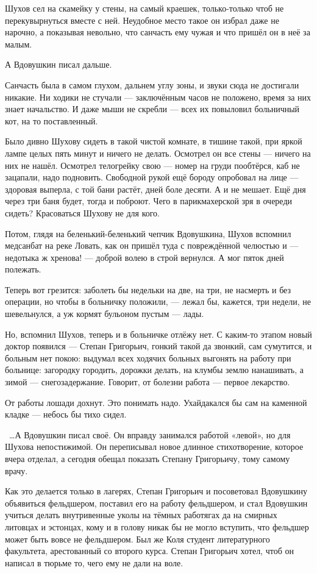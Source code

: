 Шухов сел на скамейку у стены, на самый краешек, только-только чтоб не перекувырнуться вместе с ней. Неудобное место такое он избрал даже не нарочно, а показывая невольно, что санчасть ему чужая и что пришёл он в неё за малым.

А Вдовушкин писал дальше.

Санчасть была в самом глухом, дальнем углу зоны, и звуки сюда не достигали никакие. Ни ходики не стучали --- заключённым часов не положено, время за них знает начальство. И даже мыши не скребли --- всех их повыловил больничный кот, на то поставленный.

Было дивно Шухову сидеть в такой чистой комнате, в тишине такой, при яркой лампе целых пять минут и ничего не делать. Осмотрел он все стены --- ничего на них не нашёл. Осмотрел телогрейку свою --- номер на груди пообтёрся, каб не зацапали, надо подновить. Свободной рукой ещё бороду опробовал на лице --- здоровая выперла, с той бани растёт, дней боле десяти. А и не мешает. Ещё дня через три баня будет, тогда и поброют. Чего в парикмахерской зря в очереди сидеть? Красоваться Шухову не для кого.

Потом, глядя на беленький-беленький чепчик Вдовушкина, Шухов вспомнил медсанбат на реке Ловать, как он пришёл туда с повреждённой челюстью и --- недотыка ж хренова! --- доброй волею в строй вернулся. А мог пяток дней полежать.

Теперь вот грезится: заболеть бы недельки на две, на три, не насмерть и без операции, но чтобы в больничку положили, --- лежал бы, кажется, три недели, не шевельнулся, а уж кормят бульоном пустым --- лады.

Но, вспомнил Шухов, теперь и в больничке отлёжу нет. С каким-то этапом новый доктор появился --- Степан Григорьич, гонкий такой да звонкий, сам сумутится, и больным нет покою: выдумал всех ходячих больных выгонять на работу при больнице: загородку городить, дорожки делать, на клумбы землю нанашивать, а зимой --- снегозадержание. Говорит, от болезни работа --- первое лекарство.

От работы лошади дохнут. Это понимать надо. Ухайдакался бы сам на каменной кладке --- небось бы тихо сидел.

~\dots{}А Вдовушкин писал своё. Он вправду занимался работой «левой», но для Шухова непостижимой. Он переписывал новое длинное стихотворение, которое вчера отделал, а сегодня обещал показать Степану Григорьичу, тому самому врачу.

Как это делается только в лагерях, Степан Григорьич и посоветовал Вдовушкину объявиться фельдшером, поставил его на работу фельдшером, и стал Вдовушкин учиться делать внутривенные уколы на тёмных работягах да на смирных литовцах и эстонцах, кому и в голову никак бы не могло вступить, что фельдшер может быть вовсе не фельдшером. Был же Коля студент литературного факультета, арестованный со второго курса. Степан Григорьич хотел, чтоб он написал в тюрьме то, чего ему не дали на воле.

